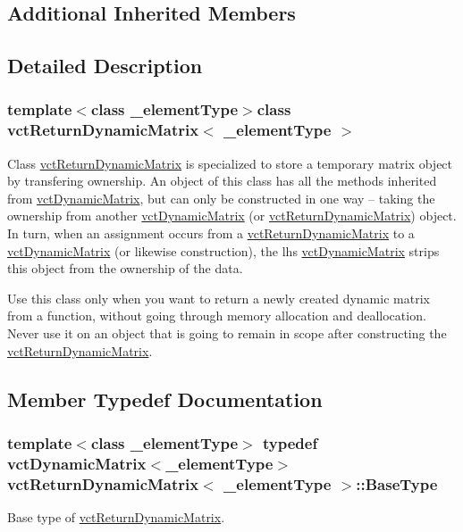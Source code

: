 \subsection*{Additional Inherited Members}


\subsection{Detailed Description}
\subsubsection*{template$<$class \-\_\-element\-Type$>$class vct\-Return\-Dynamic\-Matrix$<$ \-\_\-element\-Type $>$}

Class \hyperlink{classvct_return_dynamic_matrix}{vct\-Return\-Dynamic\-Matrix} is specialized to store a temporary matrix object by transfering ownership. An object of this class has all the methods inherited from \hyperlink{classvct_dynamic_matrix}{vct\-Dynamic\-Matrix}, but can only be constructed in one way -- taking the ownership from another \hyperlink{classvct_dynamic_matrix}{vct\-Dynamic\-Matrix} (or \hyperlink{classvct_return_dynamic_matrix}{vct\-Return\-Dynamic\-Matrix}) object. In turn, when an assignment occurs from a \hyperlink{classvct_return_dynamic_matrix}{vct\-Return\-Dynamic\-Matrix} to a \hyperlink{classvct_dynamic_matrix}{vct\-Dynamic\-Matrix} (or likewise construction), the lhs \hyperlink{classvct_dynamic_matrix}{vct\-Dynamic\-Matrix} strips this object from the ownership of the data.

Use this class only when you want to return a newly created dynamic matrix from a function, without going through memory allocation and deallocation. Never use it on an object that is going to remain in scope after constructing the \hyperlink{classvct_return_dynamic_matrix}{vct\-Return\-Dynamic\-Matrix}. 

\subsection{Member Typedef Documentation}
\hypertarget{classvct_return_dynamic_matrix_a28dcbb4e9972a46485593c2009a12ea8}{
\subsubsection[{Base\-Type}]{\setlength{\rightskip}{0pt plus 5cm}template$<$class \-\_\-element\-Type$>$ typedef {\bf vct\-Dynamic\-Matrix}$<$\-\_\-element\-Type$>$ {\bf vct\-Return\-Dynamic\-Matrix}$<$ \-\_\-element\-Type $>$\-::{\bf Base\-Type}}}\label{classvct_return_dynamic_matrix_a28dcbb4e9972a46485593c2009a12ea8}
Base type of \hyperlink{classvct_return_dynamic_matrix}{vct\-Return\-Dynamic\-Matrix}. 

